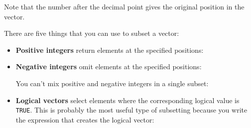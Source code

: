 Note that the number after the decimal point gives the original position
in the vector.

There are five things that you can use to subset a vector:

\begin{itemize}
\item
  \textbf{Positive integers} return elements at the specified positions:

\begin{Shaded}
\begin{Highlighting}[]
\NormalTok{x[}\NormalTok{(}\NormalTok{, }\NormalTok{)]}
\NormalTok{x[}\NormalTok{(x)]}

\NormalTok{x[}\NormalTok{(}\NormalTok{, }\NormalTok{)]}

\NormalTok{x[}\NormalTok{(}\NormalTok{, }\NormalTok{)]}
\end{Highlighting}
\end{Shaded}
\item
  \textbf{Negative integers} omit elements at the specified positions:

\begin{Shaded}
\begin{Highlighting}[]
\NormalTok{x[-}\NormalTok{(}\NormalTok{, }\NormalTok{)]}
\end{Highlighting}
\end{Shaded}

  You can't mix positive and negative integers in a single subset:

\begin{Shaded}
\begin{Highlighting}[]
\NormalTok{x[}\NormalTok{(-}\NormalTok{, }\NormalTok{)]}
\end{Highlighting}
\end{Shaded}
\item
  \textbf{Logical vectors} select elements where the corresponding
  logical value is \texttt{TRUE}. This is probably the most useful type
  of subsetting because you write the expression that creates the
  logical vector: 


\end{itemize}
